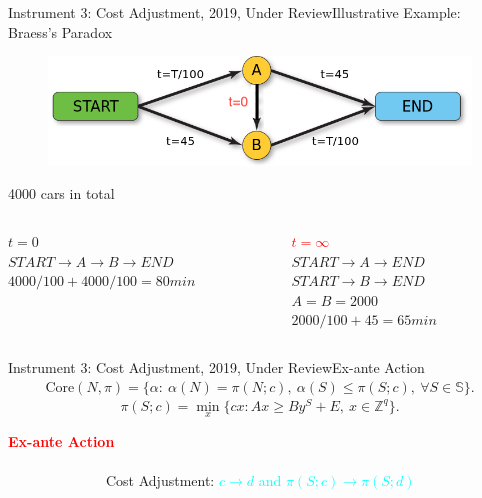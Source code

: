 \documentclass[14pt]{beamer}
\newcommand{\Z}{\mathbb{Z}}
\begin{document}
\begin{frame}{Instrument 3: Cost Adjustment, {\footnotesize 2019, Under Review}}{Illustrative Example: Braess's Paradox}
\vspace{-5mm}
\begin{figure}[H]
\centering
\includegraphics[width=1\textwidth]{braess.png}
\end{figure}
\centering
\vspace{-6mm}
4000 cars in total
\vspace{4mm}
\begin{columns}
\begin{column}{5.5cm}
\small
\centering
$t = 0$\\
\vspace{2mm}
$START \rightarrow A \rightarrow B \rightarrow END$\\
\vspace{2mm}
$4000/100  + 4000/100 = 80 min$
\end{column}
\begin{column}{5.5cm}
\small
\centering
\pause
\textcolor{red}{$t = \infty$}\\
\vspace{2mm}
$START \rightarrow A  \rightarrow END$\\
\vspace{2mm}
$START  \rightarrow B \rightarrow END$\\
\vspace{2mm}
$A=B=2000$\\
\vspace{2mm}
$2000/100+45=65min$
\end{column}
\vspace{-5mm}
\end{columns}
\vspace{-5mm}
\end{frame}



\begin{frame}{Instrument 3: Cost Adjustment, {\footnotesize 2019, Under Review}}{Ex-ante Action}
\justifying
\small
\begin{eqnarray*}
\mathrm{Core}(N,\pi) = \bigg\{ \alpha:~ \alpha(N)=\pi(N;c), ~\alpha(S) \leq \pi(S;c), ~\forall S \in \mathbb{S}    \bigg\}.
\end{eqnarray*}
\begin{equation*}
\pi(S;c) = \min_{x} \{ cx: Ax \geq By^S + E, ~x \in \Z^{q} \}.
\end{equation*}
\begin{shaded}
\textcolor{red}{\bf Ex-ante Action}\\
~\\
~~~~~~~~~~~~~~Cost Adjustment: \textcolor{cyan}{$ c \rightarrow d$ and $\pi(S;c) \rightarrow \pi(S;d)$}
\end{shaded}
\end{frame}
\end{document}
